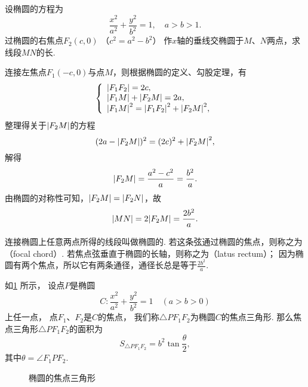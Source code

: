 \begin{example}
设椭圆的方程为\[
	\frac{x^2}{a^2}+\frac{y^2}{b^2}=1,
	\quad a>b>1.
\]
过椭圆的右焦点\(F_2(c,0)\)
（\(c^2=a^2-b^2\)）
作\(x\)轴的垂线交椭圆于\(M\)、\(N\)两点，求线段\(MN\)的长.
\begin{solution}
连接左焦点\(F_1(-c,0)\)与点\(M\)，则根据椭圆的定义、勾股定理，有\[
	\left\{ \begin{array}{l}
		\abs{F_1 F_2} = 2c, \\
		\abs{F_1 M} + \abs{F_2 M} = 2a, \\
		\abs{F_1 M}^2 = \abs{F_1 F_2}^2 + \abs{F_2 M}^2,
	\end{array} \right.
\]
整理得关于\(\abs{F_2 M}\)的方程\[
	(2a - \abs{F_2 M})^2 = (2c)^2 + \abs{F_2 M}^2,
\]
解得\[
	\abs{F_2 M} = \frac{a^2 - c^2}{a} = \frac{b^2}{a}.
\]
由椭圆的对称性可知，\(\abs{F_2 M} = \abs{F_2 N}\)，故\[
	\abs{MN} = 2\abs{F_2 M} = \frac{2 b^2}{a}.
\]
\end{solution}

连接椭圆上任意两点所得的线段叫做椭圆的.
若这条弦通过椭圆的焦点，则称之为（focal chord）.
若焦点弦垂直于椭圆的长轴，则称之为（latus rectum）；
因为椭圆有两个焦点，所以它有两条通径，通径长总是等于\(\frac{2b^2}{a}\).
\end{example}

\begin{theorem}[椭圆的焦点三角形]
如\cref{figure:解析几何.椭圆的焦点三角形} 所示，
设点\(P\)是椭圆\[
	C: \frac{x^2}{a^2} + \frac{y^2}{b^2} = 1
	\quad(a>b>0)
\]上任一点，
点\(F_1\)、\(F_2\)是\(C\)的焦点，
我们称\(\triangle P F_1 F_2\)为椭圆\(C\)的焦点三角形.
那么焦点三角形\(\triangle P F_1 F_2\)的面积为\[
S_{\triangle P F_1 F_2} = b^2 \tan\frac{\theta}{2},
\]其中\(\theta=\angle{F_1 P F_2}\).

\begin{figure}[htb]
\centering
{}
\caption{椭圆的焦点三角形}
\label{figure:解析几何.椭圆的焦点三角形}
\end{figure}
\end{theorem}

